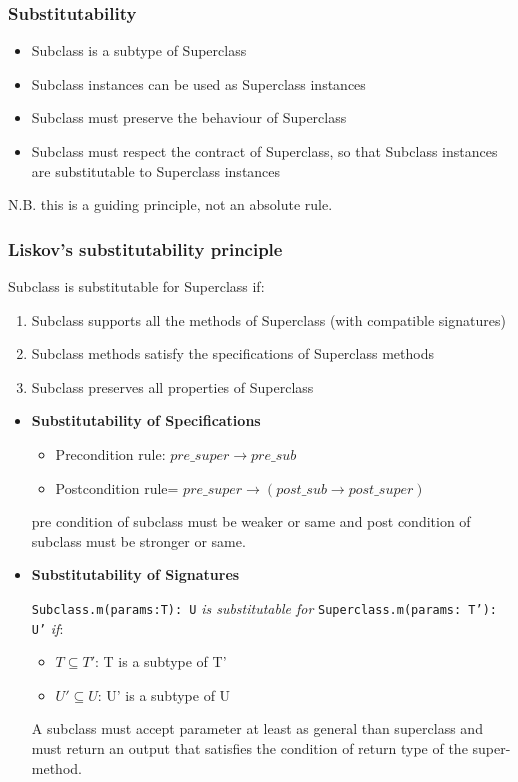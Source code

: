 \subsubsection{Substitutability}

\begin{itemize}
    \item Subclass is a subtype of Superclass
    \item Subclass instances can be used as Superclass instances
    \item Subclass must preserve the behaviour of Superclass
    \item Subclass must respect the contract of Superclass, so that Subclass instances are substitutable to Superclass instances
\end{itemize}

N.B. this is a guiding principle, not an absolute rule. \newline

\subsubsection{Liskov’s substitutability principle}

Subclass is substitutable for Superclass if:

\begin{enumerate}
    \item Subclass supports all the methods of Superclass (with compatible signatures)
    \item Subclass methods satisfy the specifications of Superclass methods
    \item Subclass preserves all properties of Superclass
\end{enumerate}

\begin{itemize}
\item \textbf{Substitutability of Specifications}
\begin{itemize}
	\item Precondition rule: $pre\_super \rightarrow pre\_sub$
	\item Postcondition rule= $pre\_super \rightarrow (post\_sub \rightarrow post\_super)$
\end{itemize}
pre condition of subclass must be weaker or same and
post condition of subclass must be stronger or same.

\item \textbf{Substitutability of Signatures}


\texttt{Subclass.m(params:T): U} \textit{is substitutable for}
\texttt{Superclass.m(params: T'): U'} \textit{if}:
\begin{itemize}
    \item $T \subseteq T'$: T is a subtype of T'
	\item $U' \subseteq U$: U' is a subtype of U
\end{itemize}

A subclass must accept parameter at least as general than superclass and
must return an output that satisfies the condition of return type of the
super-method.
\end{itemize}

